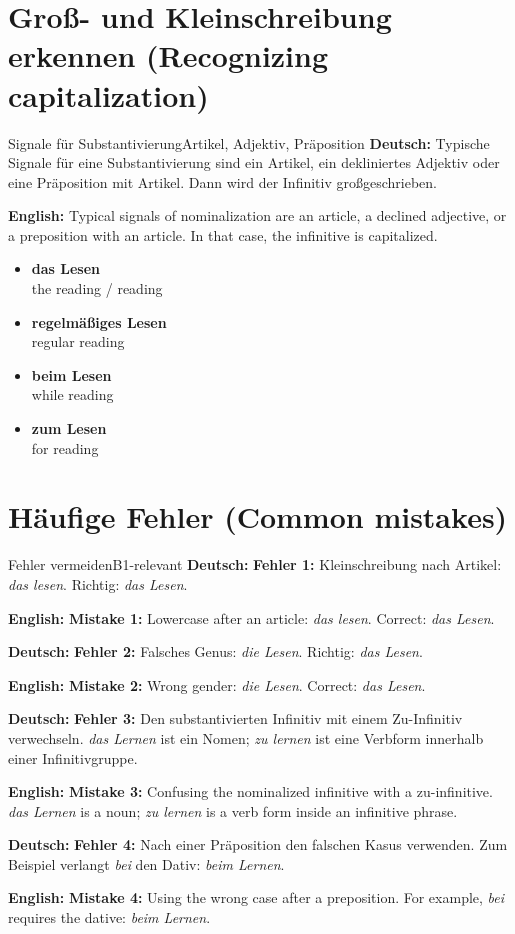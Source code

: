 \documentclass[a4paper,11pt]{article}
\newcommand{\GermanText}[1]{\textbf{Deutsch: }#1\par}
\newcommand{\EnglishText}[1]{{\small\color{SoftGray}\textbf{English: }#1\par}}
\newcommand{\ExampleItem}[2]{\item \textbf{#1}\\{\small\color{SoftGray}#2}}
\begin{document}
\section{Groß- und Kleinschreibung erkennen \textnormal{(Recognizing capitalization)}}
\begin{grammarentry}{Signale für Substantivierung}{Artikel, Adjektiv, Präposition}
\GermanText{Typische Signale für eine Substantivierung sind ein Artikel, ein dekliniertes Adjektiv oder eine Präposition mit Artikel. Dann wird der Infinitiv großgeschrieben.}
\EnglishText{Typical signals of nominalization are an article, a declined adjective, or a preposition with an article. In that case, the infinitive is capitalized.}
\end{grammarentry}

\begin{exbox}
\begin{itemize}
\ExampleItem{das Lesen}{the reading / reading}
\ExampleItem{regelmäßiges Lesen}{regular reading}
\ExampleItem{beim Lesen}{while reading}
\ExampleItem{zum Lesen}{for reading}
\end{itemize}
\end{exbox}

\section{Häufige Fehler \textnormal{(Common mistakes)}}
\begin{grammarentry}{Fehler vermeiden}{B1-relevant}
\GermanText{\textbf{Fehler 1:} Kleinschreibung nach Artikel: \textit{das lesen}. Richtig: \textit{das Lesen}.}
\EnglishText{\textbf{Mistake 1:} Lowercase after an article: \textit{das lesen}. Correct: \textit{das Lesen}.}

\GermanText{\textbf{Fehler 2:} Falsches Genus: \textit{die Lesen}. Richtig: \textit{das Lesen}.}
\EnglishText{\textbf{Mistake 2:} Wrong gender: \textit{die Lesen}. Correct: \textit{das Lesen}.}

\GermanText{\textbf{Fehler 3:} Den substantivierten Infinitiv mit einem Zu-Infinitiv verwechseln. \textit{das Lernen} ist ein Nomen; \textit{zu lernen} ist eine Verbform innerhalb einer Infinitivgruppe.}
\EnglishText{\textbf{Mistake 3:} Confusing the nominalized infinitive with a zu-infinitive. \textit{das Lernen} is a noun; \textit{zu lernen} is a verb form inside an infinitive phrase.}

\GermanText{\textbf{Fehler 4:} Nach einer Präposition den falschen Kasus verwenden. Zum Beispiel verlangt \textit{bei} den Dativ: \textit{beim Lernen}.}
\EnglishText{\textbf{Mistake 4:} Using the wrong case after a preposition. For example, \textit{bei} requires the dative: \textit{beim Lernen}.}
\end{grammarentry}
\end{document}
